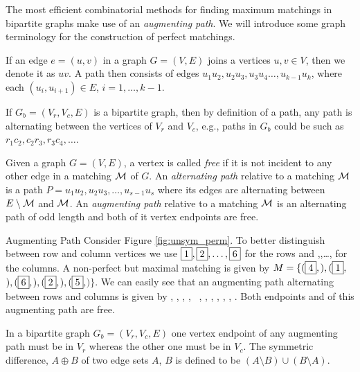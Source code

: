 The most efficient combinatorial methods for finding maximum matchings
in bipartite graphs make use of an \emph{augmenting path}. We will
introduce some graph terminology for the
 construction of perfect
matchings. 
\begin{definition}\label{def:path}
If an edge $e=(u,v)$ in a graph $G=(V,E)$
joins a vertices $u,v\in V$, then we denote it as $uv$. 
A path then consists of edges $u_1u_2,u_2u_3,u_3u_4 \ldots,u_{k-1}u_k$, where 
each $(u_i,u_{i+1})\in E$, $i=1,\dots,k-1$.
\end{definition}
If $G_b=(V_r,V_c,E)$ is a bipartite graph, then by definition of a path, 
any path is alternating between the vertices of $V_r$ and $V_c$, e.g.,
paths in $G_b$ could be such as $r_1c_2,c_2r_3,r_3c_4,\dots$.
\begin{definition}\label{def:various-paths}
Given a graph $G=(V,E)$, a 
vertex is called \emph{free} if it is not
incident to any other edge in a matching $\mathcal{M}$ of $G$. 
An \emph{alternating path} relative to a matching $\mathcal{M}$ is a path 
$P = u_1u_2,u_2u_3, \ldots,u_{s-1}u_s$ where its edges are alternating 
between $E \setminus \mathcal{M}$ and $\mathcal{M}$. An
\emph{augmenting path} relative to a matching $\mathcal{M}$ is an alternating
path of odd length and both of it vertex endpoints are free. 
\end{definition}
\begin{example}{Augmenting Path}\label{exm:augmenting_path}
Consider Figure \ref{fig:unsym_perm}.
To better distinguish between row and column vertices we use
$\fbox{$1$},\fbox{$2$},\dots,\fbox{$6$}$ for the rows and ,,\dots, for the
columns.
A non-perfect but maximal matching is given by
$M= \{(\fbox{$4$},$$), (\fbox{$1$},$$), (\fbox{$6$},$$),\\ (\fbox{$2$},$$), (\fbox{$5$},$$) \}$.
We can easily see that an augmenting path 
alternating between rows and columns is given by  ,  ,  ,  , ~,  ,  ,  ,  ,  , . Both endpoints  and 
of this augmenting path are free.
\end{example}

In a bipartite
graph $G_b= (V_r, V_c, E)$ one vertex endpoint of any
augmenting path must be in $V_r$ whereas the other one must be in $V_c$. 
The symmetric
difference, $A \oplus B$ of two edge sets $A$, $B$ is defined to be $(A
\setminus B) \cup (B \setminus A)$.

